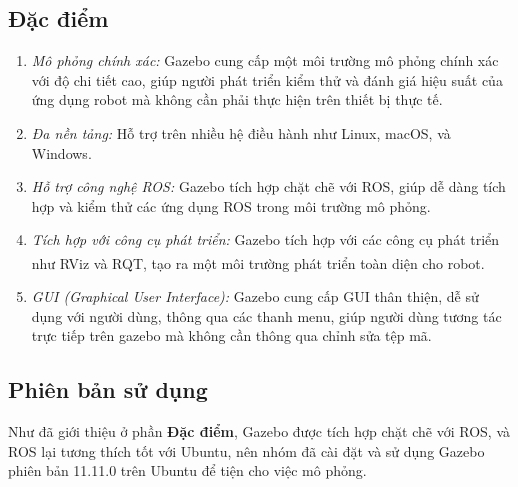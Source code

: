 \subsection{Đặc điểm}
\begin{enumerate}
    \item \textit{Mô phỏng chính xác:} Gazebo cung cấp một môi trường mô phỏng chính xác với độ chi tiết cao, giúp người phát triển kiểm thử và đánh giá hiệu suất của ứng dụng robot mà không cần phải thực hiện trên thiết bị thực tế.
    \item \textit{Đa nền tảng:} Hỗ trợ trên nhiều hệ điều hành như Linux, macOS, và Windows.
    \item \textit{Hỗ trợ công nghệ ROS:} Gazebo tích hợp chặt chẽ với ROS, giúp dễ dàng tích hợp và kiểm thử các ứng dụng ROS trong môi trường mô phỏng.
    \item \textit{Tích hợp với công cụ phát triển:} Gazebo tích hợp với các công cụ phát triển như RViz\textsuperscript{\cite{rviz}} và RQT, tạo ra một môi trường phát triển toàn diện cho robot.
    \item \textit{GUI (Graphical User Interface):} Gazebo cung cấp GUI thân thiện, dễ sử dụng với người dùng, thông qua các thanh menu, giúp người dùng tương tác trực tiếp trên gazebo mà không cần thông qua chỉnh sửa tệp mã.
\end{enumerate}
\subsection{Phiên bản sử dụng}
\tab Như đã giới thiệu ở phần \textbf{Đặc điểm}, Gazebo được tích hợp chặt chẽ với ROS, và ROS lại tương thích tốt với Ubuntu, nên nhóm đã cài đặt và sử dụng Gazebo phiên bản 11.11.0 trên Ubuntu để tiện cho việc mô phỏng.
